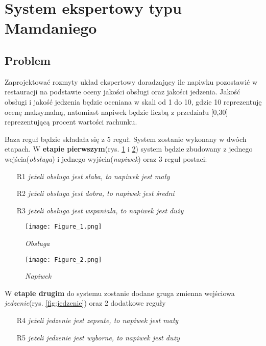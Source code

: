\section{System ekspertowy typu Mamdaniego}\label{sec:expert_system}
\subsection{Problem}\label{subsec:problem}

Zaprojektować rozmyty układ ekspertowy doradzający ile napiwku pozostawić w restauracji na podstawie oceny jakości obsługi oraz jakości jedzenia. Jakość obsługi i jakość jedzenia będzie oceniana w skali od 1 do 10, gdzie 10 reprezentuję ocenę maksymalną, natomiast napiwek będzie liczbą z przedziału [0,30] reprezentującą procent wartości rachunku.

Baza reguł będzie składała się z 5 reguł. System zostanie wykonany w dwóch etapach. W \textbf{etapie pierwszym}(rys. \ref{fig:obsluga} i \ref{fig:napiwek}) system będzie zbudowany z jednego wejścia(\emph{obsługa}) i jednego wyjścia(\emph{napiwek}) oraz 3 reguł postaci:
\begin{itemize}
	\item[R1] \emph{jeżeli obsługa jest słaba, to napiwek jest mały}
	\item[R2] \emph{jeżeli obsługa jest dobra, to napiwek jest średni}
	\item[R3] \emph{jeżeli obsługa jest wspaniała, to napiwek jest duży}
\end{itemize}

\begin{figure}[H]
	\centering
	\texttt{[image: Figure\_1.png]}
	\caption{\textit{Obsługa}}
	\label{fig:obsluga}
\end{figure}

\begin{figure}[H]
	\centering
	\texttt{[image: Figure\_2.png]}
	\caption{\textit{Napiwek}}
	\label{fig:napiwek}
\end{figure}

W \textbf{etapie drugim} do systemu zostanie dodane gruga zmienna wejściowa \emph{jedzenie}(rys. \ref{fig:jedzenie}) oraz 2 dodatkowe reguły
\begin{itemize}
	\item[R4] \emph{jeżeli jedzenie jest zepsute, to napiwek jest mały}
	\item[R5] \emph{jeżeli jedzenie jest wyborne, to napiwek jest duży}
\end{itemize}


